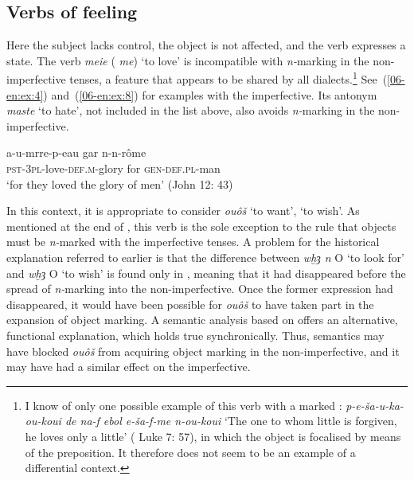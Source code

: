 \documentclass[output=paper]{LSP/langsci}
\begin{document}
\subsection{Verbs of feeling}
\label{06-en-sec:5-5}

Here the subject lacks control, the object is not affected, and the verb expresses a state. The verb \textit{meie} ( \textit{me}) ‘to love’ is incompatible with \textit{n-}marking in the non-imperfec\-tive tenses, a feature that appears to be shared by all  dialects.\footnote{I know of only one possible example of this verb with a marked : \textit{p-e-}\textit{š}\textit{a-u-ka-ou-koui de na-f ebol e-}\textit{ša-f-me n-ou-koui} ‘The one to whom little is forgiven, he loves only a little’ ( Luke 7: 57), in which the object is focalised by means of the preposition. It therefore does not seem to be an example of a differential context.} See~(\ref{06-en:ex:4}) and~(\ref{06-en:ex:8}) for examples with the imperfective. Its antonym \textit{maste} ‘to hate’, not included in the list above, also avoids \textit{n-}marking in the non-imperfective.

\begin{exe}
\ex \label{06-en:ex:37}
\gll a-u-mrre-p-eau				gar 	n-n-rôme\\
	\textsc{pst-3pl-}love-\textsc{def.m-}glory for \textsc{gen-def.pl-}man\\
\glt ‘for they loved the glory of men’ (John 12: 43)
\end{exe}

In this context, it is appropriate to consider \textit{ouôš} ‘to want’, ‘to wish’. As mentioned at the end of , this verb is the sole exception to the rule that  objects must be \textit{n-}marked with the imperfective tenses. A problem for the historical explanation referred to earlier is that the difference between \textit{wḫȝ n} O ‘to look for’ and \textit{wḫȝ} O ‘to wish’ is found only in  \citep{Depuydt1993Sake}, meaning that it had disappeared before the spread of \textit{n-}marking into the non-imperfective. Once the former expression had disappeared, it would have been possible for \textit{ouôš} to have taken part in the expansion of object marking. A semantic analysis based on  offers an alternative, functional explanation, which holds true synchronically. Thus, semantics may have blocked \textit{ouôš} from acquiring object marking in the non-imperfective, and it may have had a similar effect on the imperfective.
\end{document}
